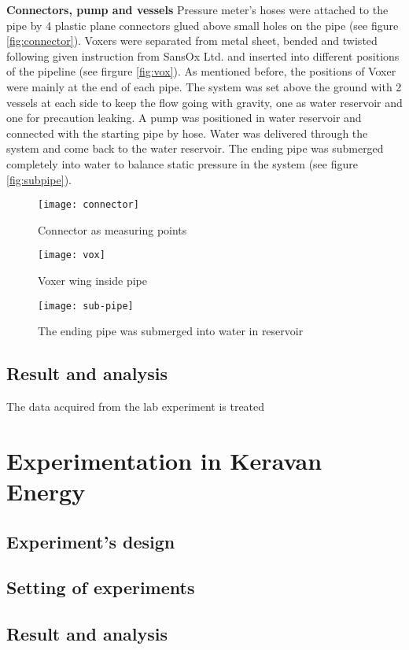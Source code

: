 \textbf{Connectors, pump and vessels}\newline
Pressure meter’s hoses were attached to the pipe by 4 plastic plane connectors glued above small holes on the pipe (see figure \vref{fig:connector}). Voxers were separated from metal sheet, bended and twisted following given instruction from SansOx Ltd. and inserted into different positions of the pipeline (see firgure \vref{fig:vox}). As mentioned before, the positions of Voxer were mainly at the end of each pipe. The system was set above the ground with 2 vessels at each side to keep the flow going with gravity, one as water reservoir and one for precaution leaking. A pump was positioned in water reservoir and connected with the starting pipe by hose. Water was delivered through the system and come back to the water reservoir. The ending pipe was submerged completely into water to balance static pressure in the system (see figure \vref{fig:subpipe}).

\begin{figure}[!htb]
   \begin{minipage}{0.48\textwidth}
     \centering
     \texttt{[image: connector]}
     \caption{Connector as measuring points}\label{fig:connector}
   \end{minipage}\hfill
   \begin {minipage}{0.48\textwidth}
     \centering
     \texttt{[image: vox]}
     \caption{Voxer wing inside pipe}\label{fig:vox}
   \end{minipage}
\end{figure}
\begin{figure}[h]
  \centering
  \texttt{[image: sub-pipe]}
  \caption{ The ending pipe was submerged into water in reservoir}
  \label{fig:subpipe}
\end{figure}
\subsection{Result and analysis}
The data acquired from the lab experiment is treated 
\section{Experimentation in Keravan Energy}
\subsection{Experiment's design}
\subsection{Setting of experiments}
\subsection{Result and analysis}

\clearpage %

